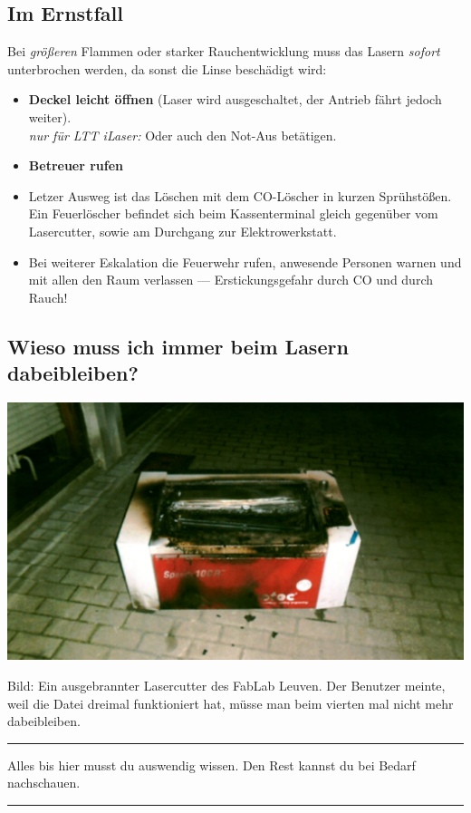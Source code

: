 \documentclass{\basedir/fablab-document}
\newcommand{\nurLTT}{\emph{nur für LTT iLaser:} }
\begin{document}
	\subsection{Im Ernstfall}
	Bei \emph{größeren} Flammen oder starker Rauchentwicklung muss das Lasern \emph{sofort} unterbrochen werden, da sonst die Linse beschädigt wird:
	\begin{itemize}
		\item \textbf{Deckel leicht öffnen} (Laser wird ausgeschaltet, der Antrieb fährt jedoch weiter).\\
		\nurLTT Oder auch den Not-Aus betätigen.
		\item \textbf{Betreuer rufen}
		\item Letzer Ausweg ist das Löschen mit dem CO-Löscher in kurzen Sprühstößen. Ein Feuerlöscher befindet sich beim Kassenterminal gleich gegenüber vom Lasercutter, sowie am Durchgang zur Elektrowerkstatt.
		\item Bei weiterer Eskalation die Feuerwehr rufen, anwesende Personen warnen und mit allen den Raum verlassen --- Erstickungsgefahr durch CO und durch Rauch!
	\end{itemize}
	
	
	\subsection{Wieso muss ich immer beim Lasern dabeibleiben?}
	\includegraphics[width=.75\linewidth]{./img/laser-abgebrannt_fablab_leuven.jpg}
	
	Bild: Ein ausgebrannter Lasercutter des FabLab Leuven. Der Benutzer meinte, weil die Datei dreimal funktioniert hat, müsse man beim vierten mal nicht mehr dabeibleiben.
	
	
	
	\vspace{5em}
	\hrule
	
	Alles bis hier musst du auswendig wissen. Den Rest kannst du bei Bedarf nachschauen.
	\vspace{0.2em}
	\hrule
	\vspace{3em}
	
\end{document}
